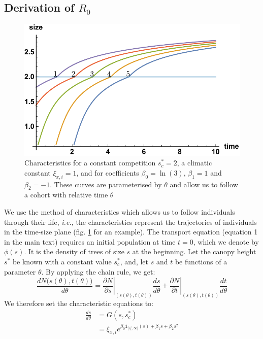\documentclass[letterpaper, 12pt]{article}
\newcommand {\ie}{\textit{i.e., }}
\newcommand {\s}{{s}^{*}}
\theoremstyle{theo}
\begin{document}
\begin{refsection}
\begin{onehalfspace}
\subsection{Derivation of $ R_0 $}
\begin{figure}[h!]
	\centering
	\includegraphics[scale = 0.75]{../illustrations/chara}
	\caption{Characteristics for a constant competition $ \s_c = 2 $, a climatic constant $ \xi_{x, i} = 1 $, and for coefficients $ \beta_0 = \ln(3) $, $ \beta_1 = 1 $ and $ \beta_2 = -1 $. These curves are parameterised by $ \theta $ and allow us to follow a cohort with relative time $ \theta $}
	\label{fig::chara}
\end{figure}
We use the method of characteristics \citep{Olver2014b} which allows us to follow individuals through their life, \ie the characteristics represent the trajectories of individuals in the time-size plane (fig. \ref{fig::chara} for an example). The transport equation (equation 1 in the main text) requires an initial population at time $ t = 0 $, which we denote by $ \phi(s) $. It is the density of trees of size $ s $ at the beginning. Let the canopy height $ \s $ be known with a constant value $ \s_c $, and, let $ s $ and $ t $ be functions of a parameter $ \theta $. By applying the chain rule, we get:
\[
	\frac{d N\big(s(\theta), t(\theta) \big)}{d \theta} = \left. \frac{\partial N}{\partial s} \right|_{(s(\theta), t(\theta))} \frac{ds}{d \theta} +
			\left. \frac{\partial N}{\partial t} \right|_{(s(\theta), t(\theta))} \frac{dt}{d \theta}
\]
We therefore set the characteristic equations to:
\begin{align}
	\frac{ds}{d \theta} &= G(s, \s_c) \label{eq::chara_s} \\
		&= \xi_{x, i} e^{\beta_0 \mathbb{1}_{[\s_c, \infty[}(s) + \beta_1 s + \beta_2 s^2} \nonumber \\

\end{align}
\end{onehalfspace}
\end{refsection}
\end{document}
